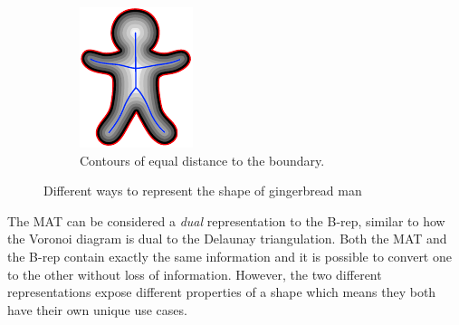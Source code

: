 \begin{figure}[tbp]
\begin{subfigure}[b]{0.3\linewidth}
		\includegraphics[width=\textwidth]{figs/gingerbreadman_grassfire.pdf}
		\caption{Contours of equal distance to the boundary.}
		\label{fig:gbm:dt}
	\end{subfigure}

	\caption{Different ways to represent the shape of gingerbread man}
	\label{fig:gingerman}
\end{figure}

The MAT can be considered a \emph{dual} representation to the B-rep, similar to how the Voronoi diagram is dual to the Delaunay triangulation. 
Both the MAT and the B-rep contain exactly the same information and it is possible to convert one to the other without loss of information.
However, the two different representations expose different properties of a shape which means they both have their own unique use cases. 

